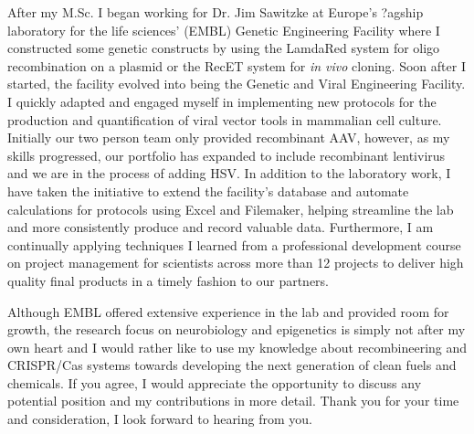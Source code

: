 \documentclass[11pt,a4paper,sans]{moderncv}
\begin{document}
\begin{spacing}{1.1}
After my M.Sc. I began working for Dr. Jim Sawitzke at  Europe's ?agship laboratory for the life sciences' (EMBL) Genetic Engineering Facility where I constructed some genetic constructs by using the LamdaRed system for oligo recombination on a plasmid or the RecET system for\textit{ in vivo} cloning.
Soon after I started, the facility evolved into being the Genetic and Viral Engineering Facility. I quickly adapted and engaged myself in implementing new protocols for the production and quantification of viral vector tools in mammalian cell culture. 			
Initially our two person team only provided recombinant AAV, however, as my skills progressed, our portfolio has expanded to include recombinant lentivirus and we are in the process of adding HSV.
In addition to the laboratory work, I have taken the initiative to extend the facility's database and automate calculations for protocols using Excel and Filemaker, helping streamline the lab and more consistently produce and record valuable data. 
Furthermore, I am continually applying techniques I learned from a professional development course on project management for scientists across more than 12 projects to deliver high quality final products in a timely fashion to our partners.\par%

Although EMBL offered extensive experience in the lab and provided room for growth, the research focus on neurobiology and epigenetics is simply not after my own heart and I would rather like to use my knowledge about recombineering and CRISPR/Cas systems towards developing the next generation of clean fuels and chemicals.
If you agree, I would appreciate the opportunity to discuss any potential position and my contributions in more detail. 
Thank you for your time and consideration, I look forward to hearing from you.
 

 

\end{spacing}
\makeletterclosing
\end{document}
